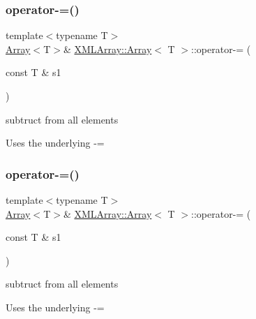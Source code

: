 \subsubsection{\texorpdfstring{operator-\/=()}{operator-=()}\hspace{0.1cm}{\footnotesize\ttfamily [4/6]}}
{\footnotesize\ttfamily template$<$typename T$>$ \\
\mbox{\hyperlink{classXMLArray_1_1Array}{Array}}$<$T$>$\& \mbox{\hyperlink{classXMLArray_1_1Array}{X\+M\+L\+Array\+::\+Array}}$<$ T $>$\+::operator-\/= (\begin{DoxyParamCaption}\item[{const T \&}]{s1 }\end{DoxyParamCaption})\hspace{0.3cm}{\ttfamily [inline]}}



subtruct from all elements 

Uses the underlying -\/= \mbox{\label{classXMLArray_1_1Array_af903951b5031ab6aa7ee8e2682055f91}} 
\subsubsection{\texorpdfstring{operator-\/=()}{operator-=()}\hspace{0.1cm}{\footnotesize\ttfamily [5/6]}}
{\footnotesize\ttfamily template$<$typename T$>$ \\
\mbox{\hyperlink{classXMLArray_1_1Array}{Array}}$<$T$>$\& \mbox{\hyperlink{classXMLArray_1_1Array}{X\+M\+L\+Array\+::\+Array}}$<$ T $>$\+::operator-\/= (\begin{DoxyParamCaption}\item[{const T \&}]{s1 }\end{DoxyParamCaption})\hspace{0.3cm}{\ttfamily [inline]}}



subtruct from all elements 

Uses the underlying -\/= \mbox{\label{classXMLArray_1_1Array_af903951b5031ab6aa7ee8e2682055f91}} 
